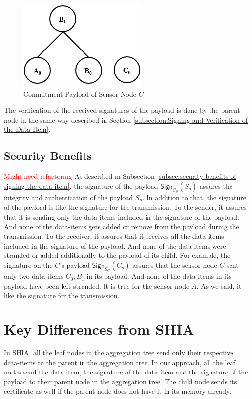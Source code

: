 	\begin{figure}[h!]
		\centering
		\includegraphics[scale = 1]{images/commitment-payload-of-C.png}
		\caption{Commitment Payload of Sensor Node $C$}
		\label{fig:Commitment payload of C}
	\end{figure}
	The verification of the received signatures of the payload is done by the parent node in the same way described in Section \ref{subsection:Signing and Verification of the Data-Item}.

	\subsection{Security Benefits}
		\textcolor{red}{Might need refactoring}
		As described in Subsection \ref{subsec:security benefits of signing the data-item}, the signature of the payload $\textsf{Sign}_{S_{S}}(S_{p})$ assures the integrity and authentication of the payload $S_{p}$.
		In addition to that, the signature of the payload is like the signature for the transmission.
		To the sender, it assures that it is sending only the data-items included in the signature of the payload.
		And none of the data-items gets added or remove from the payload during the transmission. 
		To the receiver, it assures that it receives all the data-items included in the signature of the payload. 
		And none of the data-items were stranded or added additionally to the payload of its child.
		For example, the signature on the $C$'s payload $\textsf{Sign}_{S_{C}}(C_{p})$ assures that the sensor node $C$ sent only two data-items $C_{0},B_{1}$ in its payload.
		And none of the data-items in its payload have been left stranded.
		It is true for the sensor node $A$.
		As we said, it like the signature for the transmission.

\section{Key Differences from SHIA}

	In SHIA, all the leaf nodes in the aggregation tree send only their respective data-items to the parent in the aggregation tree.
	In our approach, all the leaf nodes send the data-item, the signature of the data-item and the signature of the payload to their parent node in the aggregation tree. 
	The child node sends its certificate as well if the parent node does not have it in its memory already.

